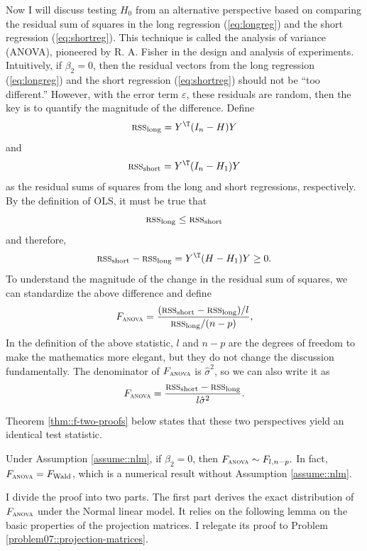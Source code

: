 Now I will discuss testing  $H_{0}$ from an alternative perspective based on comparing the residual sum of squares in the long regression (\ref{eq:longreg}) and the short regression (\ref{eq:shortreg}). This technique is called the analysis of variance (ANOVA), pioneered by R. A. Fisher in the design and analysis of experiments. Intuitively, if $\beta_{2}=0$, then the residual vectors from the long regression (\ref{eq:longreg})
and the short regression (\ref{eq:shortreg}) should not be ``too
different.'' However, with the error term $\varepsilon$, these residuals are
random, then the key is to quantify the magnitude of the difference.
Define 
\[
\textsc{rss}_{\text{long}}=Y^{\T}(I_{n}-H)Y
\]
and 
\[
\textsc{rss}_{\text{short}}=Y^{\T}(I_{n}-H_{1})Y
\]
as the residual sums of squares from the long and short regressions,
respectively. By the definition of OLS, it must be true that
$$
\textsc{rss}_{\text{long}}\leq\textsc{rss}_{\text{short}} 
$$
and therefore, 
\begin{equation}
\textsc{rss}_{\text{short}}-\textsc{rss}_{\text{long}}
=Y^{\T}(H-H_{1})Y
\geq 0.\label{eq:diffvar}
\end{equation}
To understand the magnitude of the change in the residual sum of squares,
we can standardize the above difference and define
\[
F_\textsc{anova} = \frac{(\textsc{rss}_{\text{short}}-\textsc{rss}_{\text{long}})/l}{\textsc{rss}_{\text{long}}/(n-p)},
\]
In the definition of the above statistic, $l$ and $n-p$ are the
degrees of freedom to make the mathematics more elegant, but
they do not change the discussion fundamentally. The denominator of $F_\textsc{anova} $
is $\hat{\sigma}^{2}$, so we can also write it as 
\begin{equation}
F_\textsc{anova} =\frac{\textsc{rss}_{\text{short}}-\textsc{rss}_{\text{long}}}{l\hat{\sigma}^{2}}.\label{eq:Fformula}
\end{equation}


Theorem \ref{thm::f-two-proofs} below states that these two perspectives yield an identical test statistic. 


\begin{theorem}\label{thm::f-two-proofs}
Under Assumption \ref{assume::nlm}, if $\beta_{2}=0$, then $F_\textsc{anova} \sim F_{l,n-p}.$
In fact, $F_\textsc{anova} =F_\textup{Wald}  $, which is a numerical result without Assumption \ref{assume::nlm}. 
\end{theorem}



I divide the proof into two parts. The first part derives the exact distribution of $F_\textsc{anova}$ under the Normal linear model. It relies on the following lemma on the basic properties of the projection matrices. I relegate its proof to Problem \ref{problem07::projection-matrices}. 

